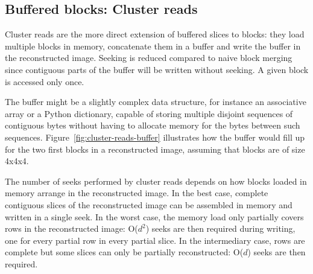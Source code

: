 \documentclass[10pt, conference, compsocconf]{IEEEtran}
\begin{document}
\subsection{Buffered blocks: Cluster reads}

Cluster reads are the more direct extension of buffered slices to
blocks: they load multiple blocks in memory, concatenate them in a
buffer and write the buffer in the reconstructed image. Seeking is
reduced compared to naive block merging since contiguous parts of the
buffer will be written without seeking. A given
block is accessed only once.

The buffer might be a slightly complex data structure, for instance an
associative array or a Python dictionary, capable of storing multiple
disjoint sequences of contiguous bytes without having to allocate
memory for the bytes between such
sequences. Figure~\ref{fig:cluster-reads-buffer} illustrates how the
buffer would fill up for the two first blocks in a reconstructed
image, assuming that blocks are of size 4x4x4.

The number of seeks performed by cluster reads depends on how blocks
loaded in memory arrange in the reconstructed image. In the best case,
complete contiguous slices of the reconstructed image can be assembled
in memory and written in a single seek. In the worst case, the
memory load only partially covers rows in the reconstructed image:
O($d^2$) seeks are then required during writing, one for every partial
row in every partial slice. In the intermediary case, rows are
complete but some slices can only be partially reconstructed: O($d$)
seeks are then required.
\end{document}
